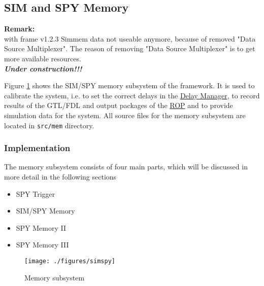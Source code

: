 % 
%
%
%

\subsection{SIM and SPY Memory}\label{sec:sim-spy}
\textbf{Remark:}\\
with frame v1.2.3 Simmem data not useable anymore, because of removed "Data Source Multiplexer".
The reason of removing "Data Source Multiplexer" is to get more available resources.\\

\textbf{\textit{Under construction!!!}}

Figure \ref{fig_simspy} shows the SIM/SPY memory subsystem of the framework.
It is used to calibrate the system, i.e. to set the correct delays in the \hyperref[sec_dm]{Delay Manager}, to record results of the GTL/FDL and
output packages of the \hyperref[sec_rop]{ROP} and to provide simulation data for the system.
All source files for the memory subsystem are located in \texttt{src/mem} directory.

\subsubsection{Implementation}\label{sec:sim_spy_impl}
The memory subsystem consists of four main parts, which will be discussed in more detail in the following sections

\begin{itemize}
\item SPY Trigger
\item SIM/SPY Memory
\item SPY Memory II
\item SPY Memory III
\end{itemize}

\begin{figure}[h]
\texttt{[image: ./figures/simspy]}
\caption{Memory subsystem}
\label{fig_simspy}
\end{figure}

